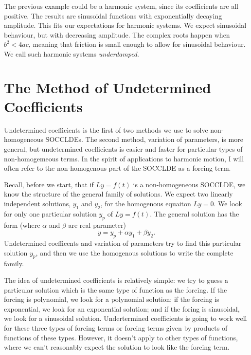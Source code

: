 \documentclass[fleqn,letterpaper]{report}
\begin{document}
The previous example could be a harmonic system, since its
coefficients are all positive. The results are sinusoidal
functions with exponentially decaying amplitude. This fits our
expectations for harmonic systems.  We expect sinusoidal
behaviour, but with decreasing amplitude.  The complex roots
happen when $b^2 < 4ac$, meaning that friction is small enough
to allow for sinusoidal behaviour.  We call such harmonic
systems \emph{underdamped}.

\section{The Method of Undetermined Coefficients}
\label{undetermined-coefficients}
 
Undetermined coefficients is the first of two methods we
use to solve non-homogeneous SOCCLDEs. The second method,
variation of parameters, is more general, but undetermined
coefficients is easier and faster for particular types of
non-homogemeous terms. In the spirit of applications to
harmonic motion, I will often refer to the non-homogenous part
of the SOCCLDE as a forcing term.

Recall, before we start, that if $Ly = f(t)$ is a
non-homogeneous SOCCLDE, we know the structure of the general
family of solutions. We expect two linearly independent
solutions, $y_1$ and $y_2$, for the homogenous equaiton $Ly =
0$. We look for only one particular solution $y_p$ of $Ly =
f(t)$. The general solution has the form (where $\alpha$ and
$\beta$ are real parameter)
\begin{equation*}
y = y_p + \alpha y_1 + \beta y_2.
\end{equation*}
Undetermined coefficents and variation of parameters try to
find this particular solution $y_p$, and then we use the
homogenous solutions to write the complete family.

The idea of undetermined coefficients is relatively simple: we
try to guess a particular solution which is the same type of
function as the forcing. If the forcing is polynomial, we look
for a polynomial solution; if the forcing is exponential, we
look for an exponential solution; and if the foring is
sinusoidal, we look for a sinusoidal solution.  Undertermined
coefficients is going to work well for these three types of
forcing terms or forcing terms given by products of functions
of these types. However, it doesn't apply to other types of
functions, where we can't reasonably expect the solution to
look like the forcing term.
\end{document}
